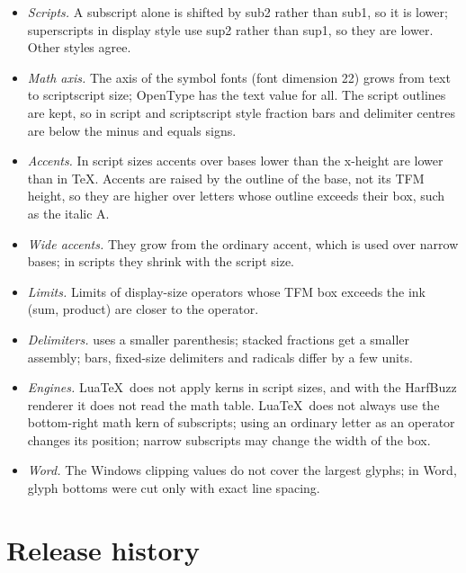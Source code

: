 \documentclass[10pt]{article}
\newcommand\code[1]{\texttt{#1}}
\begin{document}
\begin{itemize}
\item \emph{Scripts.} A subscript alone is shifted by sub2 rather than
  sub1, so it is lower; superscripts in display style use sup2 rather
  than sup1, so they are lower.  Other styles agree.
\item \emph{Math axis.} The axis of the symbol fonts (font dimension
  22) grows from text to scriptscript size; OpenType has the text value
  for all.  The script outlines
  are kept, so in script and scriptscript style fraction bars and
  delimiter centres are below the minus and equals signs.
\item \emph{Accents.} In script sizes accents over bases lower than the
  x-height are lower than in \TeX.  Accents are raised by the outline of
  the base, not its TFM height, so they are higher over letters whose
  outline exceeds their box, such as the italic A.
\item \emph{Wide accents.} They grow from the ordinary accent, which
  is used over narrow bases; in scripts they shrink with the script
  size.
\item \emph{Limits.} Limits of display-size operators whose TFM box
  exceeds the ink (sum, product) are closer to the operator.
\item \emph{Delimiters.} \code{\string\dbinom} uses a smaller
  parenthesis; stacked fractions get a smaller assembly; bars,
  fixed-size delimiters and radicals differ by a few units.
\item \emph{Engines.} Lua\TeX\ does not apply kerns in script sizes,
  and with the HarfBuzz renderer it does not read the math table.
  Lua\TeX\ does not always use the bottom-right math kern of
  subscripts; using an ordinary letter as an operator changes its
  position; narrow subscripts may change the width of the box.
\item \emph{Word.} The Windows clipping values do not cover the
  largest glyphs; in Word, glyph bottoms were cut only with exact line
  spacing.
\end{itemize}

\section{Release history}
\end{document}
